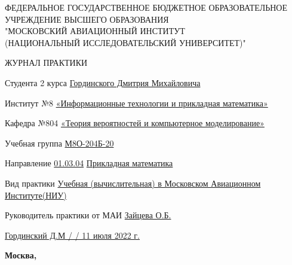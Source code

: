 \begin{titlepage}
\begin{center}
\bfseries

{\Large ФЕДЕРАЛЬНОЕ ГОСУДАРСТВЕННОЕ БЮДЖЕТНОЕ ОБРАЗОВАТЕЛЬНОЕ\\ УЧРЕЖДЕНИЕ ВЫСШЕГО ОБРАЗОВАНИЯ\\ "МОСКОВСКИЙ АВИАЦИОННЫЙ ИНСТИТУТ\\ (НАЦИОНАЛЬНЫЙ ИССЛЕДОВАТЕЛЬСКИЙ УНИВЕРСИТЕТ)"

}

\vspace{56pt}

{\large ЖУРНАЛ ПРАКТИКИ 

}

\end{center}

\vspace{36pt}

Студента 2 курса \hspace{3cm}        \underline{Гординского Дмитрия Михайловича}

\vspace{26pt}

Институт №8 \underline{«Информационные технологии и прикладная математика»}

\vspace{26pt}

Кафедра №804 \underline{«Теория вероятностей и компьютерное моделирование»}

\vspace{26pt}

Учебная группа \underline{М8О-204Б-20}

\vspace{26pt}

Направление \underline{01.03.04} \hspace{3cm} \underline{Прикладная математика}

\vspace{26pt}

Вид практики \underline{Учебная (вычислительная) в Московском Авиационном Институте(НИУ)}

\vspace{26pt}

Руководитель практики от МАИ \underline{Зайцева О.Б.} \hspace{3cm} \underline{ \hspace{3cm}}

\vspace{46pt}

\underline{Гординский Д.М / \hspace{3cm} / 11 июля 2022 г.}

\vfill

\begin{center}
\bfseries
Москва, \the\year
\end{center}
\end{titlepage}

\pagebreak
